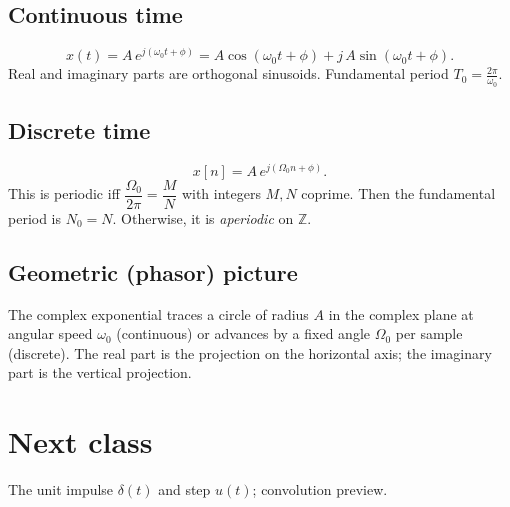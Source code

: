 \documentclass{ee102_notes}
\begin{document}
\subsection*{Continuous time}
\[
x(t)=A\,e^{j(\omega_0 t+\phi)}=A\cos(\omega_0 t+\phi)+j\,A\sin(\omega_0 t+\phi).
\]
Real and imaginary parts are orthogonal sinusoids. Fundamental period $T_0=\frac{2\pi}{\omega_0}$.

\subsection*{Discrete time}
\[
x[n]=A\,e^{j(\Omega_0 n+\phi)}.
\]
This is periodic iff $\dfrac{\Omega_0}{2\pi}=\dfrac{M}{N}$ with integers $M,N$ coprime. Then the fundamental period is $N_0=N$. Otherwise, it is \emph{aperiodic} on $\mathbb{Z}$.

\subsection*{Geometric (phasor) picture}
The complex exponential traces a circle of radius $A$ in the complex plane at angular speed $\omega_0$ (continuous) or advances by a fixed angle $\Omega_0$ per sample (discrete). The real part is the projection on the horizontal axis; the imaginary part is the vertical projection.

\section*{Next class}
The unit impulse $\delta(t)$ and step $u(t)$; convolution preview.
\end{document}
